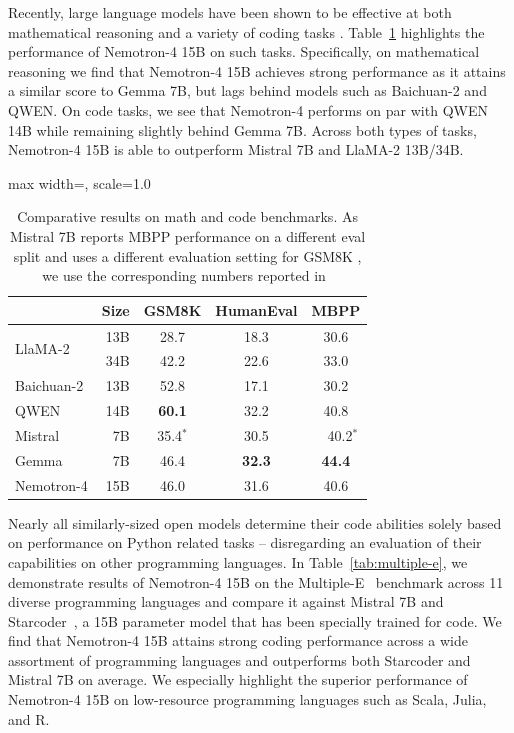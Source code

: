 \documentclass[11pt]{article}
\newcommand{\ours}{Nemotron-4}
\begin{document}
Recently, large language models have been shown to be effective at both mathematical reasoning and a variety of coding tasks \citep{allal2023santacoder,chowdhery2022palm, touvron2023llama}. Table~\ref{tab:code_external} highlights the performance of \ours{} 15B on such tasks. Specifically, on mathematical reasoning we find that \ours{} 15B achieves strong performance as it attains a similar score to Gemma 7B, but lags behind models such as Baichuan-2 and QWEN. On code tasks, we see that \ours{} performs on par with QWEN 14B while remaining slightly behind Gemma 7B. Across both types of tasks, \ours{} 15B is able to outperform Mistral 7B and LlaMA-2 13B/34B. 

\begin{table}[H]
\centering
\begin{adjustbox}{max width=\textwidth, scale=1.0}
\begin{tabular}{lrccc}
\toprule
& Size & GSM8K & HumanEval & MBPP \\
\midrule
  \multirow{2}{*}{LlaMA-2} & 13B & 28.7 & 18.3 &30.6 \\ 
 & 34B & 42.2 & 22.6 & 33.0 \\
 \midrule
 \multirow{1}{*}{Baichuan-2}  & 13B & 52.8 & 17.1  & 30.2 \\ 
 \midrule
 \multirow{1}{*}{QWEN}  & 14B & \textbf{60.1} & 32.2 & 40.8 \\
 \midrule
\multirow{1}{*}{Mistral}  & 7B & 35.4$^{*}$  &  30.5 &  \ \ 40.2$^{*}$   \\
\midrule
\multirow{1}{*}{Gemma}  & 7B & 46.4 &  \textbf{32.3} & \textbf{44.4} \\
\midrule
\multirow{1}{*}{\ours{}}  & 15B & 46.0 &   31.6 & 40.6  \\
\bottomrule
\end{tabular}
\end{adjustbox}
\caption{\label{tab:code_external} Comparative results on math and code benchmarks. As Mistral 7B reports MBPP performance on a different eval split and uses a different evaluation setting for GSM8K , we use the corresponding numbers reported in~\citep{gemma24}}
\end{table}

Nearly all similarly-sized open models determine their code abilities solely based on performance on Python related tasks -- disregarding an evaluation of their capabilities on other programming languages. In Table~\ref{tab:multiple-e}, we demonstrate results of \ours{} 15B on the Multiple-E~\citep{cassano2023multipl} benchmark across 11 diverse programming languages and compare it against Mistral 7B and Starcoder~\citep{li2023starcoder}, a 15B parameter model that has been specially trained for code. We find that \ours{} 15B attains strong coding performance across a wide assortment of programming languages and outperforms both Starcoder and Mistral 7B on average. We especially highlight the superior performance of \ours{} 15B on low-resource programming languages such as Scala, Julia, and R. 
\end{document}
